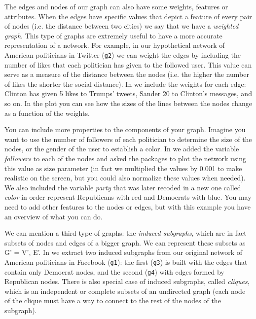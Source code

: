 
The edges and nodes of our graph can also have some weights, features or attributes. When the edges have specific values that depict a feature of every pair of nodes (i.e. the distance between two cities) we say that we have a \textit{weighted graph}. This type of graphs are extremely useful to have a more accurate representation of a network. For example, in our hypothetical network of American politicians in Twitter (\texttt{g2}) we can weight the edges by including the number of likes that each politician has given to the followed user. This value  can serve as a measure of the distance between the nodes (i.e. the higher the number of likes the shorter the social distance). In  we include the weights for each edge: Clinton has given 5 likes to Trumps' tweets, Sander 20 to Clinton's messages, and so on. In the plot you can see how the sizes of the lines between the nodes change as a function of the weights.


You can include more properties to the components of your graph. Imagine you want to use the number of followers of each politician to determine the size of the nodes, or the gender of the user to establish a color. In  we added the variable \emph{followers} to each of the nodes and asked the packages to plot the network using this value as size parameter (in fact we multiplied the values by 0.001 to make realistic on the screen, but you could also normalize these values when needed). We also included the variable \emph{party} that was later recoded in a new one called \emph{color} in order represent Republicans with red and Democrats with blue.  You may need to add other features to the nodes or edges, but with this example you have an overview of what you can do.


We can  mention a third type of graphs: the \textit{induced subgraphs}, which are in fact subsets of nodes and edges of a bigger graph. We can represent these subsets as G' = V', E'. In  we extract two induced subgraphs from our original network of American politicians in Facebook (\texttt{g1}): the first (\texttt{g3}) is built with the edges that contain only Democrat nodes, and the second (\texttt{g4}) with edges formed by Republican nodes. There is also special case of induced subgraphs, called \textit{cliques}, which is an independent or complete subsets of an undirected graph (each node of the clique must have a way to connect to the rest of the nodes of the subgraph).

